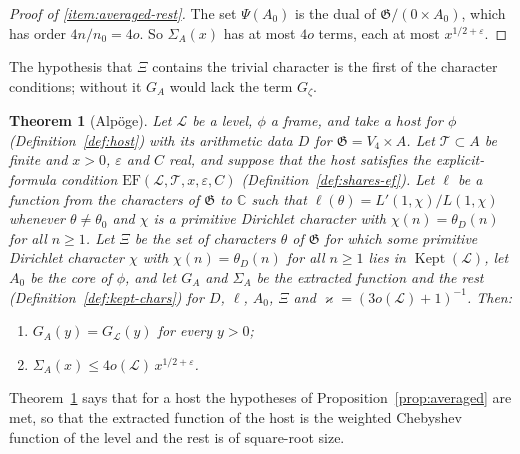 \documentclass[11pt]{amsbook}
\theoremstyle{plain}
\newtheorem{theorem}{Theorem}[section]
\theoremstyle{definition}
\theoremstyle{remark}
\numberwithin{equation}{section}
\numberwithin{figure}{chapter}
\numberwithin{table}{chapter}
\renewcommand{\C}{\mathbb{C}}
\newcommand{\eps}{\varepsilon}
\newcommand{\lev}{\mathscr{L}}
\newcommand{\Gz}{G_{\zeta}}
\newcommand{\Kept}{\operatorname{Kept}}
\newcommand{\GG}{\mathfrak{G}}
\newcommand{\Top}{\mathcal{T}}
\begin{document}
\begin{proof}[Proof of \ref{item:averaged-rest}]
The set $\Psi(A_0)$ is the dual of $\GG/(0\times A_0)$, which has order
$4n/n_0=4o$. So $\Sigma_A(x)$ has at most $4o$ terms, each at most
$x^{1/2+\eps}$.
\end{proof}

\noindent The hypothesis that $\Xi$ contains the trivial character is
the first of the character conditions; without it $G_A$ would lack the
term $\Gz$.

\begin{theorem}[Alp\"oge]\label{thm:averaged-hyps}
Let $\lev$ be a level, $\phi$ a frame, and take a host for $\phi$
(Definition~\ref{def:host}) with its arithmetic data $D$ for
$\GG=V_4\times A$. Let $\Top\subset A$ be finite and $x>0$, $\eps$ and
$C$ real, and suppose that the host satisfies the explicit-formula
condition $\mathrm{EF}(\lev,\Top,x,\eps,C)$
(Definition~\ref{def:shares-ef}). Let $\ell$ be a function from the
characters of $\GG$ to $\C$ such that $\ell(\theta)=L'(1,\chi)/L(1,\chi)$
whenever $\theta\ne\theta_0$ and $\chi$ is a primitive Dirichlet
character with $\chi(n)=\theta_D(n)$ for all $n\ge1$. Let $\Xi$ be the
set of characters $\theta$ of $\GG$ for which some primitive Dirichlet
character $\chi$ with $\chi(n)=\theta_D(n)$ for all $n\ge1$ lies in
$\Kept(\lev)$, let $A_0$ be the core of $\phi$, and let $G_A$ and
$\Sigma_A$ be the extracted function and the rest
(Definition~\ref{def:kept-chars}) for $D$, $\ell$, $A_0$, $\Xi$ and
$\varkappa=(3o(\lev)+1)^{-1}$.
Then:
\begin{enumerate}[label=(\alph*)]
\item\label{item:ah-eq} $G_A(y)=G_\lev(y)$ for every $y>0$;
\item\label{item:ah-rest} $\Sigma_A(x)\le4o(\lev)\,x^{1/2+\eps}$.
\end{enumerate}
\end{theorem}

\noindent Theorem~\ref{thm:averaged-hyps} says that for a host the
hypotheses of Proposition~\ref{prop:averaged} are met, so that the
extracted function of the host is the weighted Chebyshev function of
the level and the rest is of square-root size.
\begin{figure}[tbp]
\centering

\end{figure}
\end{document}
